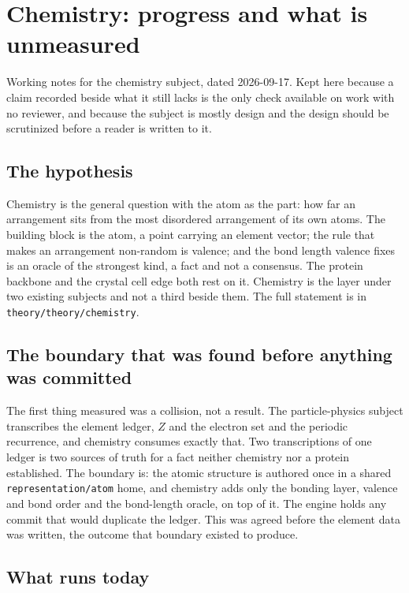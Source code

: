\chapter{Chemistry: progress and what is unmeasured}

Working notes for the chemistry subject, dated 2026-09-17. Kept here because a claim recorded beside
what it still lacks is the only check available on work with no reviewer, and because the subject is
mostly design and the design should be scrutinized before a reader is written to it.

\section*{The hypothesis}

Chemistry is the general question with the atom as the part: how far an arrangement sits from the most
disordered arrangement of its own atoms. The building block is the atom, a point carrying an element
vector; the rule that makes an arrangement non-random is valence; and the bond length valence fixes is
an oracle of the strongest kind, a fact and not a consensus. The protein backbone and the crystal
cell edge both rest on it. Chemistry is the layer under two existing subjects and not a third
beside them. The full statement is in \texttt{theory/theory/chemistry}.

\section*{The boundary that was found before anything was committed}

The first thing measured was a collision, not a result. The particle-physics subject transcribes the
element ledger, \(Z\) and the electron set and the periodic recurrence, and chemistry consumes exactly
that. Two transcriptions of one ledger is two sources of truth for a fact neither chemistry nor a
protein established. The boundary is: the atomic structure is authored once in a shared
\texttt{representation/atom} home, and chemistry adds only the bonding layer, valence and bond order
and the bond-length oracle, on top of it. The engine holds any commit that would duplicate the
ledger. This was agreed before the element data was written, the outcome that boundary
existed to produce.

\section*{What runs today}

